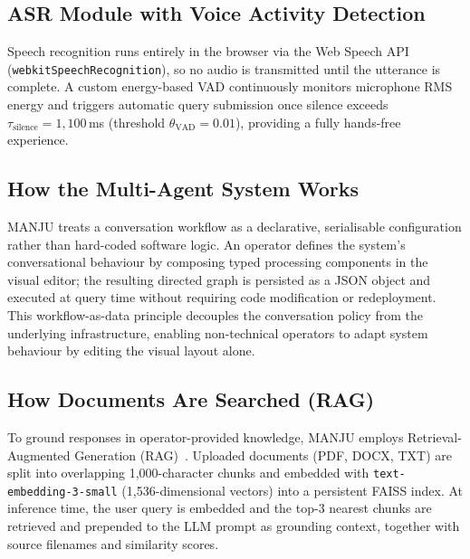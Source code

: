 \documentclass[10pt, a4paper, twocolumn]{article}
\begin{document}
\subsection{ASR Module with Voice Activity Detection}

Speech recognition runs entirely in the browser via the Web Speech API
(\texttt{webkitSpeechRecognition}), so no audio is transmitted until the
utterance is complete.
A custom energy-based VAD continuously monitors microphone RMS energy and
triggers automatic query submission once silence exceeds
$\tau_\text{silence} = 1{,}100$\,ms (threshold $\theta_\text{VAD} = 0.01$),
providing a fully hands-free experience.

\subsection{How the Multi-Agent System Works}

MANJU treats a conversation workflow as a declarative, serialisable
configuration rather than hard-coded software logic.
An operator defines the system's conversational behaviour by composing
typed processing components in the visual editor; the resulting directed
graph is persisted as a JSON object and executed at query time without
requiring code modification or redeployment.
This workflow-as-data principle decouples the conversation policy from
the underlying infrastructure, enabling non-technical operators to adapt
system behaviour by editing the visual layout alone.

\subsection{How Documents Are Searched (RAG)}
\label{sec:rag}

To ground responses in operator-provided knowledge, MANJU employs
Retrieval-Augmented Generation (RAG)~\cite{lewis2020rag}.
Uploaded documents (PDF, DOCX, TXT) are split into overlapping
1{,}000-character chunks and embedded with
\texttt{text-embedding-3-small} (1{,}536-dimensional vectors) into a
persistent FAISS index.
At inference time, the user query is embedded and the top-3 nearest
chunks are retrieved and prepended to the LLM prompt as grounding
context, together with source filenames and similarity scores.
\end{document}
